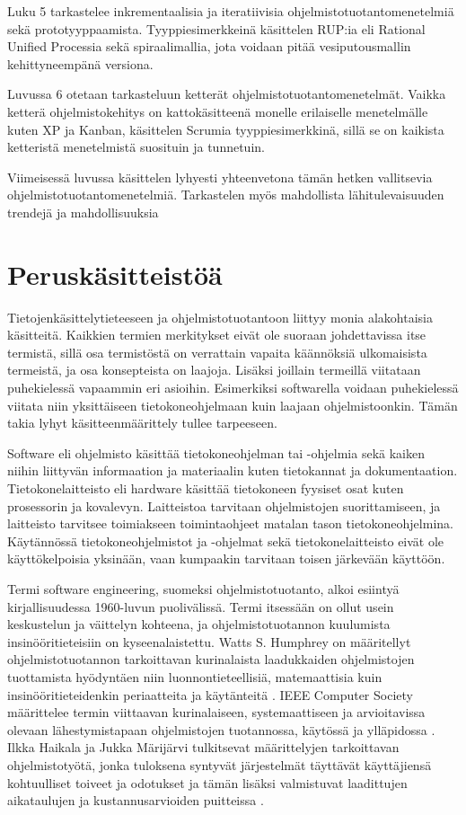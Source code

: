 \documentclass[finnish,12pt]{tktltiki2}
\theoremstyle{definition}
\theoremstyle{remark}
\begin{document}
Luku 5 tarkastelee inkrementaalisia ja iteratiivisia ohjelmistotuotantomenetelmiä sekä prototyyppaamista. Tyyppiesimerkkeinä käsittelen RUP:ia eli Rational Unified Processia sekä spiraalimallia, jota voidaan pitää vesiputousmallin kehittyneempänä versiona.

Luvussa 6 otetaan tarkasteluun ketterät ohjelmistotuotantomenetelmät. Vaikka ketterä ohjelmistokehitys on kattokäsitteenä monelle erilaiselle menetelmälle kuten XP ja Kanban, käsittelen Scrumia tyyppiesimerkkinä, sillä se on kaikista ketteristä menetelmistä suosituin ja tunnetuin.

Viimeisessä luvussa käsittelen lyhyesti yhteenvetona tämän hetken vallitsevia ohjelmistotuotantomenetelmiä. Tarkastelen myös mahdollista lähitulevaisuuden trendejä ja mahdollisuuksia

\section{Peruskäsitteistöä}
Tietojenkäsittelytieteeseen ja ohjelmistotuotantoon liittyy monia alakohtaisia käsitteitä. Kaikkien termien merkitykset eivät ole suoraan johdettavissa itse termistä, sillä osa termistöstä on verrattain vapaita käännöksiä ulkomaisista termeistä, ja osa konsepteista on laajoja. Lisäksi joillain termeillä viitataan puhekielessä  vapaammin eri asioihin. Esimerkiksi softwarella voidaan puhekielessä viitata niin yksittäiseen tietokoneohjelmaan kuin laajaan ohjelmistoonkin. Tämän takia lyhyt käsitteenmäärittely tullee tarpeeseen.

Software eli ohjelmisto käsittää tietokoneohjelman tai -ohjelmia sekä kaiken niihin liittyvän informaation ja materiaalin kuten tietokannat ja dokumentaation. \newline Tietokonelaitteisto eli hardware käsittää tietokoneen fyysiset osat kuten prosessorin ja kovalevyn. Laitteistoa tarvitaan ohjelmistojen suorittamiseen, ja laitteisto tarvitsee toimiakseen toimintaohjeet matalan tason tietokoneohjelmina. Käytännössä tietokoneohjelmistot ja -ohjelmat sekä tietokonelaitteisto eivät ole käyttökelpoisia yksinään, vaan kumpaakin tarvitaan toisen järkevään käyttöön.

Termi software engineering, suomeksi ohjelmistotuotanto, alkoi esiintyä kirjallisuudessa 1960-luvun puolivälissä. Termi itsessään on ollut usein keskustelun ja väittelyn kohteena, ja ohjelmistotuotannon kuulumista insinööritieteisiin on kyseenalaistettu. \cite{DBLP:reference/se/Grier10,haikala2003ohjelmistotuotanto,mahoney04}
Watts S. Humphrey on määritellyt ohjelmistotuotannon tarkoittavan kurinalaista laadukkaiden ohjelmistojen tuottamista hyödyntäen niin luonnontieteellisiä, matemaattisia kuin insinööritieteidenkin periaatteita ja käytänteitä \cite{Humphrey:1988:SEP:75110.75122}. IEEE Computer Society määrittelee termin viittaavan kurinalaiseen, systemaattiseen ja arvioitavissa olevaan lähestymistapaan ohjelmistojen tuotannossa, käytössä ja ylläpidossa \cite{swebok}. Ilkka Haikala ja Jukka Märijärvi tulkitsevat määrittelyjen tarkoittavan ohjelmistotyötä, jonka tuloksena syntyvät järjestelmät täyttävät käyttäjiensä kohtuulliset toiveet ja odotukset ja tämän lisäksi valmistuvat laadittujen aikataulujen ja kustannusarvioiden puitteissa \cite{haikala2003ohjelmistotuotanto}.
\end{document}
